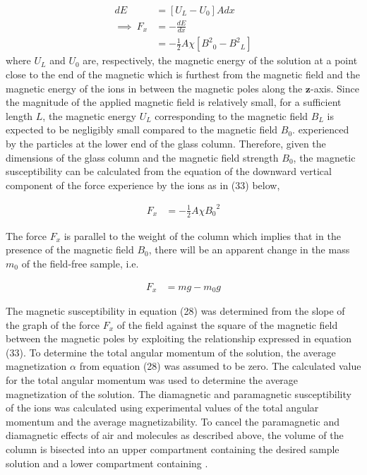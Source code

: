 \documentclass[a4paper,11pt]{article}
\begin{document}
\begin{align}
dE	& = [U_L - U_0]Adx\\
\implies~F_x	& = -\frac{dE}{dx}\\
				& = -\frac{1}{2}A \chi [{B^2}_0 - {B^2}_L]\nonumber
\end{align}   
where $U_L$ and $U_0$ are, respectively, the magnetic energy of the solution at a point close to the end of the magnetic which is furthest from the magnetic field and the magnetic energy of the ions in between the magnetic poles along the $\mathbf{z}$-axis. Since the magnitude of the applied magnetic field is relatively small, for a sufficient length $L$, the magnetic energy $U_L$ corresponding to the magnetic field $B_L$ is expected to be negligibly small compared to the magnetic field $B_0$. experienced by the particles at the lower end of the glass column. Therefore, given the dimensions of the glass column and the magnetic field strength $B_0$, the magnetic susceptibility can be calculated from the equation of the downward vertical component of the force experience by the ions as in (33) below,

\begin{align}
F_x	& = -\frac{1}{2} A \chi {B_0}^2
\end{align}

The force $F_x$ is parallel to the weight of the column which implies that in the presence of the magnetic field $B_0$, there will be an apparent change in the mass $m_0$ of the field-free sample, i.e.

\begin{align}
F_x	& = mg - m_0 g
\end{align}

The magnetic susceptibility in equation (28) was determined from the slope of the graph of the force $F_x$ of the field against the square of the magnetic field between the magnetic poles by exploiting the relationship expressed in equation (33). To determine the total angular momentum of the solution, the average magnetization $\alpha$ from equation (28) was assumed to be zero. The calculated value for the total angular momentum was used to determine the average magnetization of the solution. The diamagnetic and paramagnetic susceptibility of the ions was calculated using experimental values of the total angular momentum and the average magnetizability. To cancel the paramagnetic and diamagnetic effects of air and  molecules as described above, the volume of the column is bisected into an upper compartment containing the desired sample solution and a lower compartment containing \cite{marcon2012}. 
\end{document}
